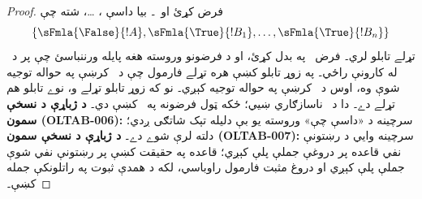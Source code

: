 \documentclass[12pt,a4paper,oneside]{report}
\gdef\pspart{#2}\gdef\pschapter{#3}\gdef\pssection{}%
\newcommand{\ollabel}[1]{\label{\pspart:\pschapter:\pssection:#1}}
\newtheorem{prop}[thm]{قضيه}
\theoremstyle{definition}
\begin{document}
\label{olpseg:OLP-0106-B014:start}
\begin{proof}
  فرض کړئ  او~۔ بيا داسې
  ، \dots،  شته چې
  \[
  \{\sFmla{\False}{!A}, \sFmla{\True}{!B_1}, \dots, \sFmla{\True}{!B_n}\}
  \]
  تړلے تابلو لري۔ فرض~ په
   بدل کړئ، او د فرضونو وروسته هغه
   پايله ورننباسئ چې پر
   د~\TRule{\True}{\lnot} له کارونې
  راځي۔ په زوړ تابلو کښې هره تړلے فارمول چې د~ کرښې په
  حواله توجيه شوې وه، اوس د~ کرښې په حواله توجيه کېږي۔ نو که
  زوړ تابلو تړلے و، نوے تابلو هم تړلے دے۔ دا د~\LR{$\Gamma$} ناسازګاري
  ښيي؛ ځکه ټول فرضونه په~\LR{$\Gamma$} کښې دي۔
  \textbf{د ژباړې د نسخې سمون (OLTAB-006):} سرچينه د «داسې چې»
  وروسته يو بې دليله تېک شاتګی ږدي؛ دلته لرې شوے دے۔
  \textbf{د ژباړې د نسخې سمون (OLTAB-007):} سرچينه وايي د رښتونې
  نفي قاعده پر دروغې جملې پلې کېږي؛ قاعده په حقيقت کښې پر رښتونې
  نفي شوې جملې پلې کېږي او دروغ مثبت فارمول راوباسي، لکه د همدې
  ثبوت په راتلونکې جمله کښې۔
\end{proof}
\label{olpseg:OLP-0106-B014:end}

\label{olpseg:OLP-0106-B015:start}
\label{olpseg:OLP-0106-B015:end}
\end{document}
